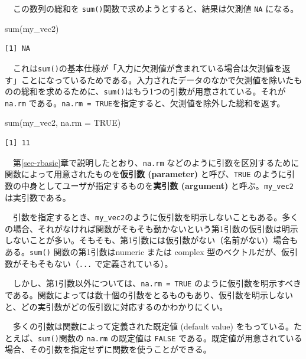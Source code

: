 \documentclass[
  a4paper,
  pandoc,
  ja=standard,
  jafont=haranoaji]{bxjsbook}
\newenvironment{Shaded}{\begin{snugshade}}{\end{snugshade}}
\newcommand{\AttributeTok}[1]{\textcolor[rgb]{0.00,0.48,0.65}{#1}}
\newcommand{\ConstantTok}[1]{\textcolor[rgb]{0.56,0.35,0.01}{#1}}
\newcommand{\FunctionTok}[1]{\textcolor[rgb]{0.28,0.35,0.67}{#1}}
\newcommand{\NormalTok}[1]{\textcolor[rgb]{0.00,0.48,0.65}{#1}}
\begin{document}
　この数列の総和を \texttt{sum()}関数で求めようとすると、結果は欠測値
\texttt{NA} になる。

\begin{Shaded}
\begin{Highlighting}[numbers=left,,]
\FunctionTok{sum}\NormalTok{(my\_vec2)}
\end{Highlighting}
\end{Shaded}

\begin{verbatim}
[1] NA
\end{verbatim}

　これは\texttt{sum()}の基本仕様が「入力に欠測値が含まれている場合は欠測値を返す」ことになっているためである。入力されたデータのなかで欠測値を除いたものの総和を求めるために、\texttt{sum()}はもう1つの引数が用意されている。それが
\texttt{na.rm}
である。\texttt{na.rm\ =\ TRUE}を指定すると、欠測値を除外した総和を返す。

\begin{Shaded}
\begin{Highlighting}[numbers=left,,]
\FunctionTok{sum}\NormalTok{(my\_vec2, }\AttributeTok{na.rm =} \ConstantTok{TRUE}\NormalTok{)}
\end{Highlighting}
\end{Shaded}

\begin{verbatim}
[1] 11
\end{verbatim}

　第\ref{sec-rbasic}章で説明したとおり、\texttt{na.rm}
などのように引数を区別するために関数によって用意されたものを\textbf{仮引数
(parameter)} と呼び、\texttt{TRUE}
のように引数の中身としてユーザが指定するものを\textbf{実引数 (argument)}
と呼ぶ。\texttt{my\_vec2} は実引数である。

　引数を指定するとき、\texttt{my\_vec2}のように仮引数を明示しないこともある。多くの場合、それがなければ関数がそもそも動かないという第1引数の仮引数は明示しないことが多い。そもそも、第1引数には仮引数がない（名前がない）場合もある。\texttt{sum()}
関数の第1引数はnumeric または complex
型のベクトルだが、仮引数がそもそもない（\texttt{...}
で定義されている）。

　しかし、第1引数以外については、\texttt{na.rm\ =\ TRUE}
のように仮引数を明示すべきである。関数によっては数十個の引数をとるものもあり、仮引数を明示しないと、どの実引数がどの仮引数に対応するのかわかりにくい。

　多くの引数は関数によって定義された既定値 (default value)
をもっている。たとえば、\texttt{sum()}関数の \texttt{na.rm} の既定値は
\texttt{FALSE}
である。既定値が用意されている場合、その引数を指定せずに関数を使うことができる。
\end{document}
